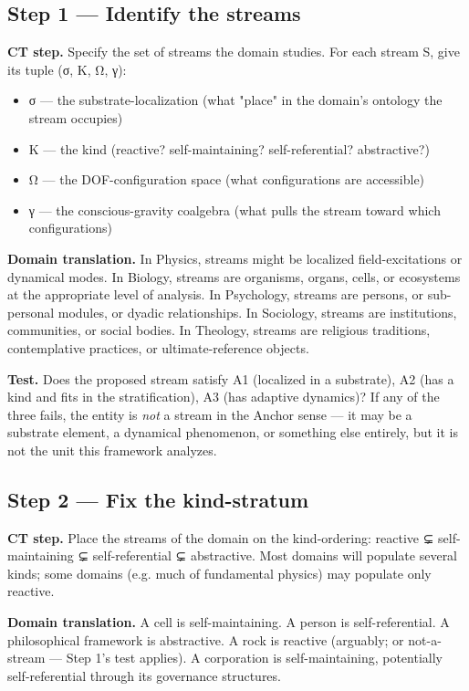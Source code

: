 \documentclass[11pt, openany]{book}
\begin{document}
\subsection{Step 1 --- Identify the streams}

\textbf{CT step.} Specify the set of streams the domain studies. For each stream S, give its tuple (σ, K, Ω, γ):

\begin{itemize}
\item σ --- the substrate-localization (what "place" in the domain's ontology the stream occupies)
\item K --- the kind (reactive? self-maintaining? self-referential? abstractive?)
\item Ω --- the DOF-configuration space (what configurations are accessible)
\item γ --- the conscious-gravity coalgebra (what pulls the stream toward which configurations)
\end{itemize}

\textbf{Domain translation.} In Physics, streams might be localized field-excitations or dynamical modes. In Biology, streams are organisms, organs, cells, or ecosystems at the appropriate level of analysis. In Psychology, streams are persons, or sub-personal modules, or dyadic relationships. In Sociology, streams are institutions, communities, or social bodies. In Theology, streams are religious traditions, contemplative practices, or ultimate-reference objects.

\textbf{Test.} Does the proposed stream satisfy A1 (localized in a substrate), A2 (has a kind and fits in the stratification), A3 (has adaptive dynamics)? If any of the three fails, the entity is \textit{not} a stream in the Anchor sense --- it may be a substrate element, a dynamical phenomenon, or something else entirely, but it is not the unit this framework analyzes.

\subsection{Step 2 --- Fix the kind-stratum}

\textbf{CT step.} Place the streams of the domain on the kind-ordering: reactive ⊊ self-maintaining ⊊ self-referential ⊊ abstractive. Most domains will populate several kinds; some domains (e.g. much of fundamental physics) may populate only reactive.

\textbf{Domain translation.} A cell is self-maintaining. A person is self-referential. A philosophical framework is abstractive. A rock is reactive (arguably; or not-a-stream --- Step 1's test applies). A corporation is self-maintaining, potentially self-referential through its governance structures.
\end{document}
